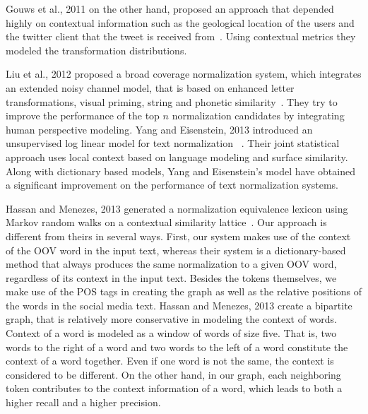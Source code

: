 \documentclass[preprint,review,12pt]{elsarticle}
\begin{document}
Gouws et al., 2011 on the other hand, proposed an approach that depended highly on contextual information such as the geological location of the users and the twitter client that the tweet is received from~\cite{Gouws:2011:CBL:2021109.2021113}. Using contextual metrics they modeled the transformation distributions.

Liu et al., 2012 proposed a broad coverage normalization system, which integrates an extended noisy channel model, that is based on enhanced letter transformations, visual priming, string and phonetic similarity~\cite{liu2012broad}. They try to improve the performance of the top $n$ normalization candidates by integrating human perspective modeling.
Yang and Eisenstein, 2013 introduced an unsupervised log linear model for text normalization ~\cite{DBLP:conf/emnlp/YangE13}. Their joint statistical approach uses local context based on language modeling and surface similarity. Along with dictionary based models, Yang and Eisenstein's model have obtained a significant improvement on the performance of text normalization systems.

Hassan and Menezes, 2013 generated a normalization equivalence lexicon using Markov random walks on a contextual similarity lattice~\cite{DBLP:conf/acl/HassanM13}. Our approach is different from theirs in several ways. First, our system makes use of the context of the OOV word in the input text, whereas their system is a dictionary-based method that always produces the same normalization to a given OOV word, regardless of its context in the input text. Besides the tokens themselves, we make use of the POS tags in creating the graph as well as the relative positions of the words in the social media text. Hassan and Menezes, 2013 create a bipartite graph, that is relatively more conservative in modeling the context of words. Context of a word is modeled as a window of words of size five. That is, two words to the right of a word and two words to the left of a word constitute the context of a word together. Even if one word is not the same, the context is considered to be different. On the other hand, in our graph, each neighboring token contributes to the context information of a word, which leads to both a higher recall and a higher precision.
\end{document}
